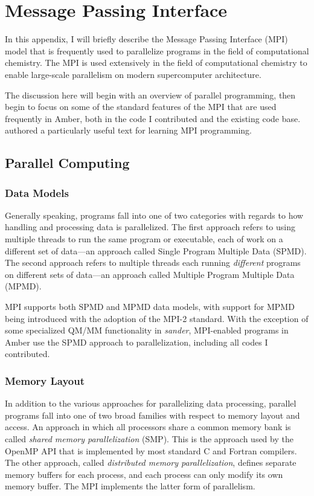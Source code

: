 \chapter{Message Passing Interface}
\label{appendixB}

In this appendix, I will briefly describe the Message Passing Interface (MPI)
model that is frequently used to parallelize programs in the field of
computational chemistry. The MPI is used extensively in the field of
computational chemistry to enable large-scale parallelism on modern
supercomputer architecture.

The discussion here will begin with an overview of parallel programming, then
begin to focus on some of the standard features of the MPI that are used
frequently in Amber, both in the code I contributed and the existing code base.
\citeauthor{Pachecho1997} authored a particularly useful text for learning MPI
programming. \cite{Pachecho1997}

\section{Parallel Computing}

\subsection{Data Models}

Generally speaking, programs fall into one of two categories with regards to how
handling and processing data is parallelized. The first approach refers to using
multiple threads to run the same program or executable, each of work on a
different set of data---an approach called Single Program Multiple Data (SPMD).
The second approach refers to multiple threads each running \emph{different}
programs on different sets of data---an approach called Multiple Program
Multiple Data (MPMD).

MPI supports both SPMD and MPMD data models, with support for MPMD being
introduced with the adoption of the MPI-2 standard. With the exception of some
specialized QM/MM functionality in \emph{sander}, MPI-enabled programs in Amber
use the SPMD approach to parallelization, including all codes I contributed.

\subsection{Memory Layout}

In addition to the various approaches for parallelizing data processing,
parallel programs fall into one of two broad families with respect to memory
layout and access. An approach in which all processors share a common memory
bank is called \emph{shared memory parallelization} (SMP). This is the approach
used by the OpenMP API that is implemented by most standard C and Fortran
compilers. The other approach, called \emph{distributed memory parallelization},
defines separate memory buffers for each process, and each process can only
modify its own memory buffer. The MPI implements the latter form of parallelism.

